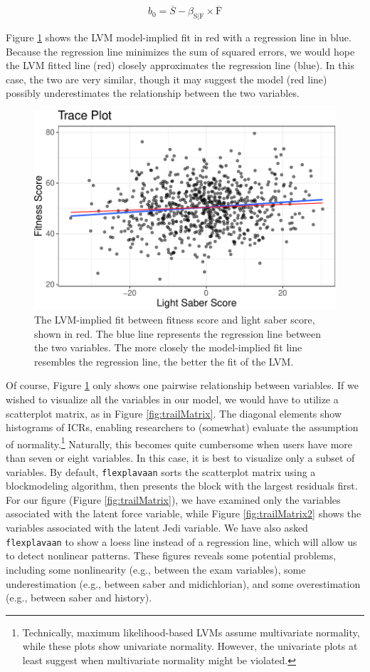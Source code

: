 \documentclass[
  english,
  man]{apa6}
\begin{document}
\[b_0=\overline{S}-\beta_{\text{S}|\text{F}}\times \overline{\text{F}}\]

Figure \ref{fig:trail1} shows the LVM model-implied fit in red with a regression line in blue. Because the regression line minimizes the sum of squared errors, we would hope the LVM fitted line (red) closely approximates the regression line (blue). In this case, the two are very similar, though it may suggest the model (red line) possibly underestimates the relationship between the two variables.

\begin{figure}

{\centering \includegraphics[width=0.7\linewidth]{flexplavaan_draft_files/figure-latex/trail1-1} 

}

\caption{The LVM-implied fit between fitness score and light saber score, shown in red. The blue line represents the regression line between the two variables. The more closely the model-implied fit line resembles the regression line, the better the fit of the LVM.}\label{fig:trail1}
\end{figure}

Of course, Figure \ref{fig:trail1} only shows one pairwise relationship between variables. If we wished to visualize all the variables in our model, we would have to utilize a scatterplot matrix, as in Figure \ref{fig:trailMatrix}. The diagonal elements show histograms of ICRs, enabling researchers to (somewhat) evaluate the assumption of normality.\footnote{Technically, maximum likelihood-based LVMs assume multivariate normality, while these plots show univariate normality. However, the univariate plots at least suggest when multivariate normality might be violated.} Naturally, this becomes quite cumbersome when users have more than seven or eight variables. In this case, it is best to visualize only a subset of variables. By default, \texttt{flexplavaan} sorts the scatterplot matrix using a blockmodeling algorithm, then presents the block with the largest residuals first. For our figure (Figure \ref{fig:trailMatrix}), we have examined only the variables associated with the latent force variable, while Figure \ref{fig:trailMatrix2} shows the variables associated with the latent Jedi variable. We have also asked \texttt{flexplavaan} to show a loess line instead of a regression line, which will allow us to detect nonlinear patterns. These figures reveals some potential problems, including some nonlinearity (e.g., between the exam variables), some underestimation (e.g., between saber and midichlorian), and some overestimation (e.g., between saber and history).
\end{document}
